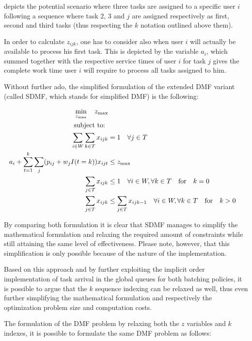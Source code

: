 \documentclass{seal_thesis}
\begin{document}
 depicts the potential scenario where three tasks are assigned to a specific user $i$ following a sequence where task 2, 3 and $j$ are assigned respectively as first, second and third tasks (thus respecting the $k$ notation outlined above them). 

In order to calculate $z_{ijk}$, one has to consider also when user $i$ will actually be available to process his first task. This is depicted by the variable $a_i$, which summed together with the respective service times of user $i$ for task $j$ gives the complete work time user $i$ will require to process all tasks assigned to him.


Without further ado, the simplified formulation of the extended DMF variant (called SDMF, which stands for simplified DMF) is the following:

\begin{align}
    \min_{z_{\text{max}}} \quad z_{\text{max}}\\
    \text{subject to: } \notag \\
    \sum_{i \in W} \sum_{k \in T} x_{ijk} &= 1 \quad \forall j \in T\\
    a_i + \sum_{t=1}^k \sum_j (p_{ij} + w_j I(t=k))x_{ijt} &\leq z_{\text{max}}\\
    \sum_{j \in T} x_{ijk} &\leq 1 \quad \forall i \in W, \forall k \in T \quad \text{for} \quad k=0\\
    \sum_{j \in T} x_{ijk} &\leq \sum_{j \in T} x_{ijk-1} \quad \forall i \in W, \forall k \in T \quad \text{for} \quad k>0
\end{align}

By comparing both formulation it is clear that SDMF manages to simplify the mathematical formulation and relaxing the required amount of constraints while still attaining the same level of effectiveness. Please note, however, that this simplification is only possible because of the nature of the implementation.

Based on this approach and by further exploiting the implicit order implementation of task arrival in the global queues for both batching policies, it is possible to argue that the $k$ sequence indexing can be relaxed as well, thus even further simplifying the mathematical formulation and respectively the optimization problem size and computation costs.

The formulation of the DMF problem by relaxing both the $z$ variables and $k$ indexes, it is possible to formulate the same DMF problem as follows:
\end{document}

